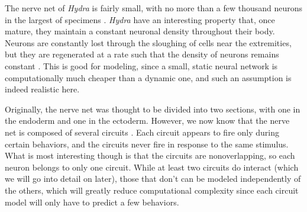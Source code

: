 \documentclass{article}
\begin{document}
The nerve net of \textit{Hydra} is fairly small, with no more than a few thousand neurons in the largest of specimens \cite{neuron_count}. \textit{Hydra} have an interesting property that, once mature, they maintain a constant neuronal density throughout their body. Neurons are constantly lost through the sloughing of cells near the extremities, but they are regenerated at a rate such that the density of neurons remains constant \cite{density}. This is good for modeling, since a small, static neural network is computationally much cheaper than a dynamic one, and such an assumption is indeed realistic here.

Originally, the nerve net was thought to be divided into two sections, with one in the endoderm and one in the ectoderm. However, we now know that the nerve net is composed of several circuits \cite{hydra}. Each circuit appears to fire only during certain behaviors, and the circuits never fire in response to the same stimulus. What is most interesting though is that the circuits are nonoverlapping, so each neuron belongs to only one circuit. While at least two circuits do interact (which we will go into detail on later), those that don't can be modeled independently of the others, which will greatly reduce computational complexity since each circuit model will only have to predict a few behaviors.
\end{document}
